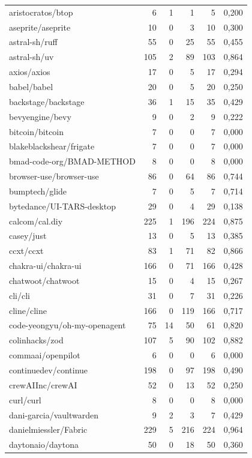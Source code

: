 \begin{tabular}{lrrrrr}
aristocratos/btop & 6 & 1 & 1 & 5 & 0,200 \\
aseprite/aseprite & 10 & 0 & 3 & 10 & 0,300 \\
astral-sh/ruff & 55 & 0 & 25 & 55 & 0,455 \\
astral-sh/uv & 105 & 2 & 89 & 103 & 0,864 \\
axios/axios & 17 & 0 & 5 & 17 & 0,294 \\
babel/babel & 20 & 0 & 5 & 20 & 0,250 \\
backstage/backstage & 36 & 1 & 15 & 35 & 0,429 \\
bevyengine/bevy & 9 & 0 & 2 & 9 & 0,222 \\
bitcoin/bitcoin & 7 & 0 & 0 & 7 & 0,000 \\
blakeblackshear/frigate & 7 & 0 & 0 & 7 & 0,000 \\
bmad-code-org/BMAD-METHOD & 8 & 0 & 0 & 8 & 0,000 \\
browser-use/browser-use & 86 & 0 & 64 & 86 & 0,744 \\
bumptech/glide & 7 & 0 & 5 & 7 & 0,714 \\
bytedance/UI-TARS-desktop & 29 & 0 & 4 & 29 & 0,138 \\
calcom/cal.diy & 225 & 1 & 196 & 224 & 0,875 \\
casey/just & 13 & 0 & 5 & 13 & 0,385 \\
ccxt/ccxt & 83 & 1 & 71 & 82 & 0,866 \\
chakra-ui/chakra-ui & 166 & 0 & 71 & 166 & 0,428 \\
chatwoot/chatwoot & 15 & 0 & 4 & 15 & 0,267 \\
cli/cli & 31 & 0 & 7 & 31 & 0,226 \\
cline/cline & 166 & 0 & 119 & 166 & 0,717 \\
code-yeongyu/oh-my-openagent & 75 & 14 & 50 & 61 & 0,820 \\
colinhacks/zod & 107 & 5 & 90 & 102 & 0,882 \\
commaai/openpilot & 6 & 0 & 0 & 6 & 0,000 \\
continuedev/continue & 198 & 0 & 97 & 198 & 0,490 \\
crewAIInc/crewAI & 52 & 0 & 13 & 52 & 0,250 \\
curl/curl & 8 & 0 & 0 & 8 & 0,000 \\
dani-garcia/vaultwarden & 9 & 2 & 3 & 7 & 0,429 \\
danielmiessler/Fabric & 229 & 5 & 216 & 224 & 0,964 \\
daytonaio/daytona & 50 & 0 & 18 & 50 & 0,360 \\

\end{tabular}
